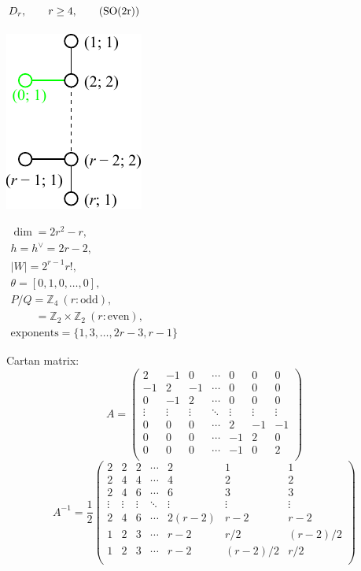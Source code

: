 \documentclass[12pt]{article}
\newcommand{\Zb}{\mathbb{Z}}
\newcommand{\SO}{\rm SO}
\newcommand{\hc}{h^{\vee}}
\begin{document}
\subsection*{$D_r,\qquad r\ge 4,\qquad (\SO(2r))$}
\parbox{8cm}{\includegraphics{lie_D.pdf}}
$
\begin{array}{l}
 \dim = 2r^2-r, \\
  h=\hc= 2 r-2,\\
 |W|=2^{r-1} r!,\\
 \theta=[0,1,0,\dots,0],\\
 P/Q=\Zb_4\ (r:\text{odd}), \\
  \qquad\    =\Zb_2 \times \Zb_2\ (r:\text{even}),\\
 \text{exponents}={\{1,3,\dots,2r-3,r-1\}}
\end{array}
$

Cartan matrix:
\[
A=\left(
\begin{array}{ccccccc}
 2 & -1& 0 &\cdots & 0 & 0  &0 \\
 -1& 2 & -1 &\cdots & 0 & 0 &0 \\
 0 & -1 & 2 &\cdots & 0 & 0 &0 \\
  \vdots&\vdots &\vdots &\ddots &\vdots &\vdots&\vdots \\
 0&0 &0 &\cdots & 2& -1 & -1\\
 0&0 &0 &\cdots & -1& 2 &  0 \\
 0&0 &0 &\cdots & -1 & 0 & 2\\
\end{array}
\right)\]
\[
A^{-1}=\frac{1}{2}
\left(
\begin{array}{ccccccc}
 2& 2& 2 &\cdots & 2 & 1 & 1 \\
 2& 4 & 4 &\cdots & 4 & 2 & 2 \\
 2& 4 & 6 &\cdots & 6 & 3 & 3 \\
  \vdots&\vdots &\vdots &\ddots &\vdots &\vdots &\vdots \\
 2&4 &6 &\cdots & 2(r-2)& r-2 & r-2\\
 1&2 &3 &\cdots & r-2  & r/2 & (r-2)/2\\
 1&2 &3 &\cdots & r-2  & (r-2)/2 & r/2\\
\end{array}
\right)
\]
\end{document}
